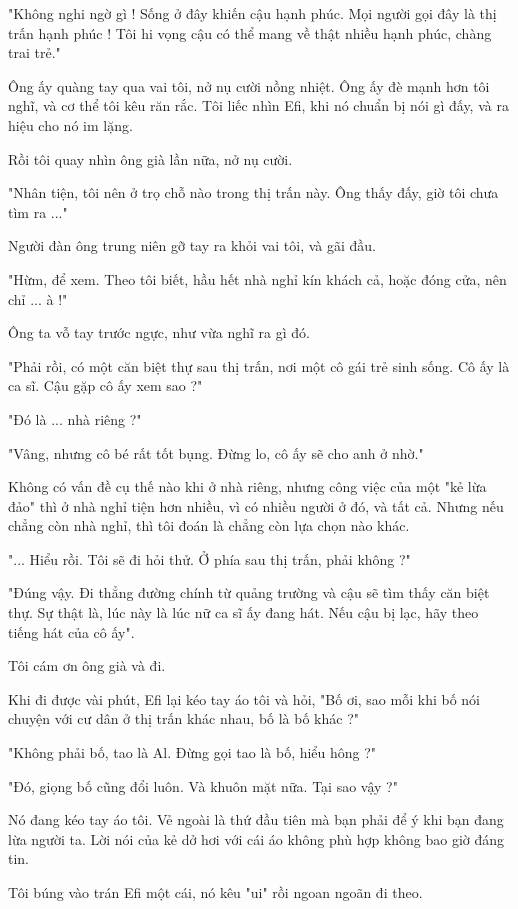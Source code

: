 "Không nghi ngờ gì ! Sống ở đây khiến cậu hạnh phúc. Mọi người gọi đây là thị trấn hạnh phúc ! Tôi hi vọng cậu có thể mang về thật nhiều hạnh phúc, chàng trai trẻ."

Ông ấy quàng tay qua vai tôi, nở nụ cười nồng nhiệt. Ông ấy đè mạnh hơn tôi nghĩ, và cơ thể tôi kêu răn rắc. Tôi liếc nhìn Efi, khi nó chuẩn bị nói gì đấy, và ra hiệu cho nó im lặng.

Rồi tôi quay nhìn ông già lần nữa, nở nụ cười.

"Nhân tiện, tôi nên ở trọ chỗ nào trong thị trấn này. Ông thấy đấy, giờ tôi chưa tìm ra ..."

Người đàn ông trung niên gỡ tay ra khỏi vai tôi, và gãi đầu.

"Hừm, để xem. Theo tôi biết, hầu hết nhà nghỉ kín khách cả, hoặc đóng cửa, nên chỉ ... à !"

Ông ta vỗ tay trước ngực, như vừa nghĩ ra gì đó.

"Phải rồi, có một căn biệt thự sau thị trấn, nơi một cô gái trẻ sinh sống. Cô ấy là ca sĩ. Cậu gặp cô ấy xem sao ?"

"Đó là ... nhà riêng ?"

"Vâng, nhưng cô bé rất tốt bụng. Đừng lo, cô ấy sẽ cho anh ở nhờ."

Không có vấn đề cụ thế nào khi ở nhà riêng, nhưng công việc của một "kẻ lừa đảo" thì ở nhà nghỉ tiện hơn nhiều, vì có nhiều người ở đó, và tất cả. Nhưng nếu chẳng còn nhà nghỉ, thì tôi đoán là chẳng còn lựa chọn nào khác.

"... Hiểu rồi. Tôi sẽ đi hỏi thử. Ở phía sau thị trấn, phải không ?"

"Đúng vậy. Đi thẳng đường chính từ quảng trường và cậu sẽ tìm thấy căn biệt thự. Sự thật là, lúc này là lúc nữ ca sĩ ấy đang hát. Nếu cậu bị lạc, hãy theo tiếng hát của cô ấy".

Tôi cám ơn ông già và đi.

Khi đi được vài phút, Efi lại kéo tay áo tôi và hỏi, "Bố ơi, sao mỗi khi bố nói chuyện với cư dân ở thị trấn khác nhau, bố là bố khác ?"

"Không phải bố, tao là Al. Đừng gọi tao là bố, hiểu hông ?"

"Đó, giọng bố cũng đổi luôn. Và khuôn mặt nữa. Tại sao vậy ?"

Nó đang kéo tay áo tôi. Vẻ ngoài là thứ đầu tiên mà bạn phải để ý khi bạn đang lừa người ta. Lời nói của kẻ dở hơi với cái áo không phù hợp không bao giờ đáng tin.

Tôi búng vào trán Efi một cái, nó kêu "ui" rồi ngoan ngoãn đi theo.

